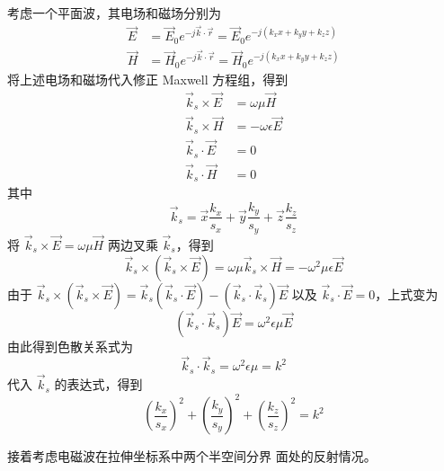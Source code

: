 \begin{solution}
    考虑一个平面波，其电场和磁场分别为
    \begin{align*}
        \vec{E}&=\vec{E}_0e^{-j\vec{k}\cdot\vec{r}}
        =\vec{E}_0e^{-j(k_x x+k_y y+k_z z)}\\
        \vec{H}&=\vec{H}_0e^{-j\vec{k}\cdot\vec{r}}
        =\vec{H}_0e^{-j(k_x x+k_y y+k_z z)}
    \end{align*}
    将上述电场和磁场代入修正 Maxwell 方程组，得到
    \begin{align*}
        \vec{k}_s\times\vec{E}&=\omega\mu\vec{H}\\
        \vec{k}_s\times\vec{H}&=-\omega\epsilon\vec{E}\\
        \vec{k}_s\cdot\vec{E}&=0\\
        \vec{k}_s\cdot\vec{H}&=0
    \end{align*}
    其中
    \begin{equation*}
        \vec{k}_s=\vec{x}\frac{k_x}{s_x}
        +\vec{y}\frac{k_y}{s_y}
        +\vec{z}\frac{k_z}{s_z}
    \end{equation*}
    将 $\vec{k}_s\times\vec{E}=\omega\mu\vec{H}$ 
    两边叉乘 $\vec{k}_s$，得到
    \begin{equation*}
        \vec{k}_s\times(\vec{k}_s\times\vec{E})
        =\omega\mu\vec{k}_s\times\vec{H}
        =-\omega^2\mu\epsilon\vec{E}
    \end{equation*}
    由于 $\vec{k}_s\times(\vec{k}_s\times\vec{E})=
    \vec{k}_s(\vec{k}_s\cdot\vec{E})
    -(\vec{k}_s\cdot\vec{k}_s)\vec{E}$
    以及 $\vec{k}_s\cdot\vec{E}=0$，上式变为
    \begin{equation*}
        (\vec{k}_s\cdot\vec{k}_s)\vec{E}
        =\omega^2\epsilon\mu\vec{E}
    \end{equation*}
    由此得到色散关系式为
    \begin{equation*}
        \vec{k}_s\cdot\vec{k}_s
        =\omega^2\epsilon\mu=k^2
    \end{equation*}
    代入 $\vec{k}_s$ 的表达式，得到
    \begin{equation*}
        \left(
            \frac{k_x}{s_x}
        \right)^2
        +\left(
            \frac{k_y}{s_y}
        \right)^2
        +\left(
            \frac{k_z}{s_z}
        \right)^2=k^2
    \end{equation*}
\end{solution}

\par 接着考虑电磁波在拉伸坐标系中两个半空间分界
面处的反射情况。

